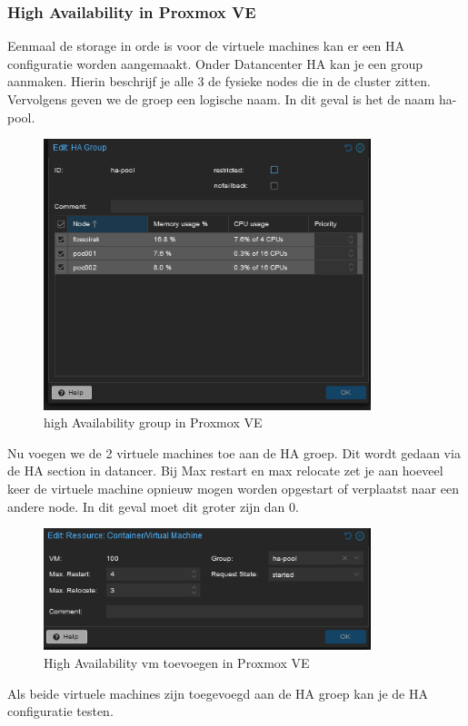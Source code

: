 \subsubsection{High Availability in Proxmox VE}

Eenmaal de storage in orde is voor de virtuele machines kan er een HA configuratie worden aangemaakt. 
Onder Datancenter HA kan je een group aanmaken. Hierin beschrijf je alle 3 de fysieke nodes die in de cluster zitten. Vervolgens geven we de groep een logische naam. In dit geval is het de naam ha-pool.
\begin{figure}[H]
  \centering
  \includegraphics[width=0.85\textwidth]{../poc/ha-group.png}
  \caption{high Availability group in Proxmox VE}
  \label{fig:ha-group}
\end{figure}
Nu voegen we de 2 virtuele machines toe aan de HA groep. Dit wordt gedaan via de HA section in datancer.
Bij Max restart en max relocate zet je aan hoeveel keer de virtuele machine opnieuw mogen worden opgestart of verplaatst naar een andere node. In dit geval moet dit groter zijn dan 0.
\begin{figure}[H]
  \centering
  \includegraphics[width=0.85\textwidth]{../poc/vm-ha.png}
  \caption{High Availability vm toevoegen in Proxmox VE}
  \label{fig:ha-vm}
\end{figure}
Als beide virtuele machines zijn toegevoegd aan de HA groep kan je de HA configuratie testen.

